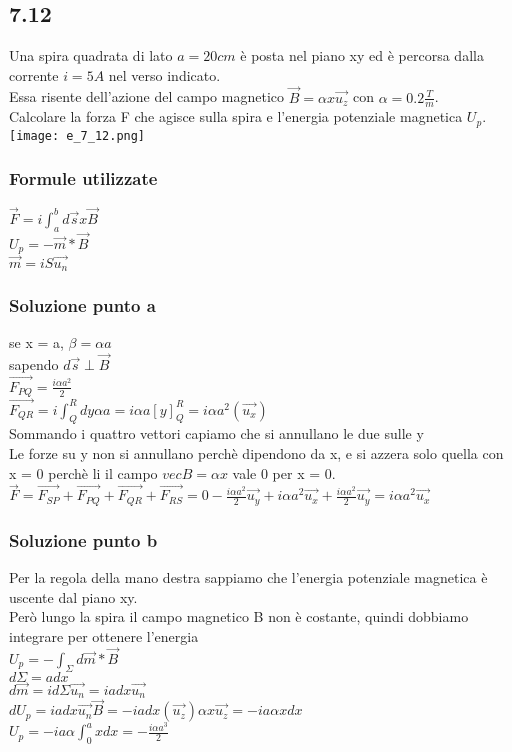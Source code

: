 \documentclass[../../main.tex]{subfiles}
\begin{document}
\subsection*{7.12}
Una spira quadrata di lato $a=20cm$ è posta nel piano xy ed è percorsa dalla corrente $i = 5A$ nel verso indicato.
\\Essa risente dell'azione del campo magnetico $\vec{B} = \alpha x \vec{u_z}$ con $\alpha = 0.2 \frac{T}{m}$.
\\Calcolare la forza F che agisce sulla spira e l'energia potenziale magnetica $U_p$.
\\\texttt{[image: e\_7\_12.png]}
\subsubsection*{Formule utilizzate}
$\vec{F} = i\int_a^bd\vec{s}x\vec{B}$
\\$U_p = -\vec{m} * \vec{B}$
\\$ \vec{m} = i S \vec{u_n}$
\subsubsection*{Soluzione punto a}
se x = a, $\beta = \alpha a$
\\sapendo $d\vec{s}\perp \vec{B}$
\\$\vec{F_{PQ}} = \frac{i\alpha a^2}{2}$
\\$\vec{F_{QR}} = i\int_Q^Rdy\alpha a = i\alpha a[y]_Q^R = i \alpha a^2 (\vec{u_x})$
\\Sommando i quattro vettori capiamo che si annullano le due sulle y
\\Le forze su y non si annullano perchè dipendono da x, e si azzera solo quella con x = 0 perchè li il campo $  vec{B} = \alpha x $ vale 0 per x = 0.
\\$\vec{F} = \vec{F_{SP}} + \vec{F_{PQ}} + \vec{F_{QR}} + \vec{F_{RS}} = 0 - \frac{i\alpha a^2}{2}\vec{u_y} + i\alpha a^2\vec{u_x} + \frac{i\alpha a^2}{2}\vec{u_y} = i \alpha a^2 \vec{u_x}$
\subsubsection*{Soluzione punto b}
Per la regola della mano destra sappiamo che l'energia potenziale magnetica è uscente dal piano xy.
\\Però lungo la spira il campo magnetico B non è costante, quindi dobbiamo integrare per ottenere l'energia
\\$U_p = -\int_\Sigma d\vec{m} * \vec{B}$
\\$d\Sigma = adx$
\\$d\vec{m} = id\Sigma\vec{u_n} = i a dx \vec{u_n}$
\\$dU_p = iadx\vec{u_n}\vec{B} = -iadx(\vec{u_z})\alpha x \vec{u_z} = -ia\alpha x dx$
\\$U_p = -ia\alpha \int_0^axdx = -\frac{i\alpha a^3}{2}$
\newpage
\end{document}
